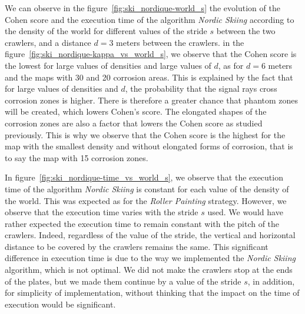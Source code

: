 \documentclass[english,RandD]{rapportPFE}  %
\begin{document}
			We can observe in the figure~\ref{fig:ski_nordique-world_s} the evolution of the Cohen score and the execution time of the algorithm \textit{Nordic Skiing} according to the density of the world for different values of the stride $s$ between the two crawlers, and a distance $d = 3$ meters between the crawlers.
			in the figure~\ref{fig:ski_nordique-kappa_vs_world_s}, we observe that the Cohen score is the lowest for large values of densities and large values of $d$, as for $d = 6$ meters and the maps with 30 and 20 corrosion areas.
			This is explained by the fact that for large values of densities and $d$, the probability that the signal rays cross corrosion zones is higher.
			There is therefore a greater chance that phantom zones will be created, which lowers Cohen's score.
			The elongated shapes of the corrosion zones are also a factor that lowers the Cohen score as studied previously.
			This is why we observe that the Cohen score is the highest for the map with the smallest density and without elongated forms of corrosion, that is to say the map with 15 corrosion zones.

			In figure~\ref{fig:ski_nordique-time_vs_world_s}, we observe that the execution time of the algorithm \textit{Nordic Skiing} is constant for each value of the density of the world.
			This was expected as for the \textit{Roller Painting} strategy.
			However, we observe that the execution time varies with the stride $s$ used.
			We would have rather expected the execution time to remain constant with the pitch of the crawlers.
			Indeed, regardless of the value of the stride, the vertical and horizontal distance to be covered by the crawlers remains the same.
			This significant difference in execution time is due to the way we implemented the \textit{Nordic Skiing} algorithm, which is not optimal.
			We did not make the crawlers stop at the ends of the plates, but we made them continue by a value of the stride $s$, in addition, for simplicity of implementation, without thinking that the impact on the time of execution would be significant.
\end{document}
